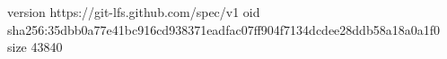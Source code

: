 version https://git-lfs.github.com/spec/v1
oid sha256:35dbb0a77e41bc916cd938371eadfac07ff904f7134dcdee28ddb58a18a0a1f0
size 43840
